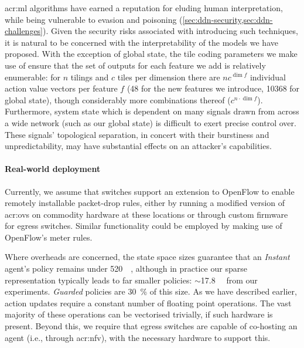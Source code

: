 \gls{acr:ml} algorithms have earned a reputation for eluding human interpretation, while being vulnerable to evasion and poisoning (\cref{sec:ddn-security,sec:ddn-challenges}).
Given the security risks associated with introducing such techniques, it is natural to be concerned with the interpretability of the models we have proposed.
With the exception of global state, the tile coding parameters we make use of ensure that the set of outputs for each feature we add is relatively enumerable: for $n$ tilings and $c$ tiles per dimension there are $nc^{\dim{f}}$ individual action value vectors per feature $f$ (\num{48} for the new features we introduce, \num{10368} for global state), though considerably more combinations thereof ($c^{n \cdot \dim{f}}$).
Furthermore, system state which is dependent on many signals drawn from across a wide network (such as our global state) is difficult to exert precise control over.
These signals' topological separation, in concert with their burstiness and unpredictability, may have substantial effects on an attacker's capabilities.

\paragraph{Real-world deployment}
Currently, we assume that switches support an extension to OpenFlow to enable remotely installable packet-drop rules, either by running a modified version of \gls{acr:ovs} on commodity hardware at these locations or through custom firmware for egress switches.
Similar functionality could be employed by making use of OpenFlow's meter rules.

Where overheads are concerned, the state space sizes guarantee that an \emph{Instant} agent's policy remains under \qty{520}{\kibi\byte}, although in practice our sparse representation typically leads to far smaller policies: $\sim$\qty{17.8}{\kibi\byte} from our experiments.
\emph{Guarded} policies are \SI{30}{\percent} of this size.
As we have described earlier, action updates require a constant number of floating point operations.
The vast majority of these operations can be vectorised trivially, if such hardware is present.
Beyond this, we require that egress switches are capable of co-hosting an agent (i.e., through \gls{acr:nfv}), with the necessary hardware to support this.

